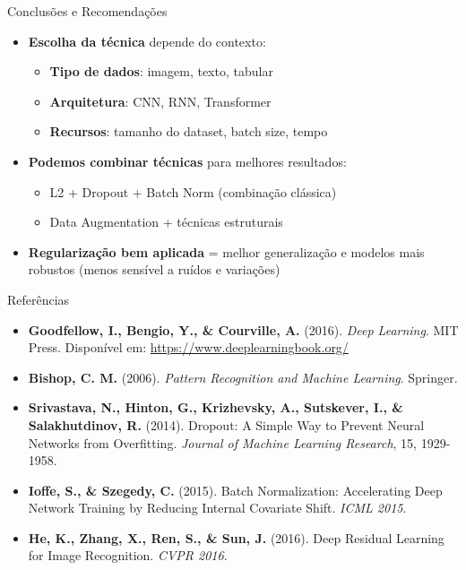 \documentclass{beamer}
\begin{document}
\begin{frame}{Conclusões e Recomendações}
\begin{itemize}
    \item \textbf{Escolha da técnica} depende do contexto:
    \begin{itemize}
        \item \textbf{Tipo de dados}: imagem, texto, tabular
        \item \textbf{Arquitetura}: CNN, RNN, Transformer
        \item \textbf{Recursos}: tamanho do dataset, batch size, tempo
    \end{itemize}
    
    \item \textbf{Podemos combinar técnicas} para melhores resultados:
    \begin{itemize}
        \item L2 + Dropout + Batch Norm (combinação clássica)
        \item Data Augmentation + técnicas estruturais
    \end{itemize}
    
    \item \textbf{Regularização bem aplicada} = melhor generalização e modelos mais robustos (menos sensível a ruídos e variações)
\end{itemize}

\end{frame}

\begin{frame}{Referências}
\footnotesize
\begin{itemize}
    \item \textbf{Goodfellow, I., Bengio, Y., \& Courville, A.} (2016). \textit{Deep Learning}. MIT Press. Disponível em: \url{https://www.deeplearningbook.org/}
    
    \item \textbf{Bishop, C. M.} (2006). \textit{Pattern Recognition and Machine Learning}. Springer.
    
    \item \textbf{Srivastava, N., Hinton, G., Krizhevsky, A., Sutskever, I., \& Salakhutdinov, R.} (2014). Dropout: A Simple Way to Prevent Neural Networks from Overfitting. \textit{Journal of Machine Learning Research}, 15, 1929-1958.
    
    \item \textbf{Ioffe, S., \& Szegedy, C.} (2015). Batch Normalization: Accelerating Deep Network Training by Reducing Internal Covariate Shift. \textit{ICML 2015}.
    
    \item \textbf{He, K., Zhang, X., Ren, S., \& Sun, J.} (2016). Deep Residual Learning for Image Recognition. \textit{CVPR 2016}.
\end{itemize}
\end{frame}
\end{document}
